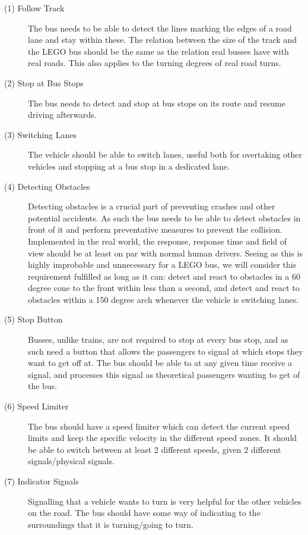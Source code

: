 
\begin{description}
    \item [(1) Follow Track]
    The bus needs to be able to detect the lines marking the edges of a road lane and stay within these. The relation between the size of the track and the LEGO bus should be the same as the relation real busses have with real roads. This also applies to the turning degrees of real road turns. 
    
    \item[(2) Stop at Bus Stops]
    The bus needs to detect and stop at bus stops on its route and resume driving afterwards. 

    \item[(3) Switching Lanes] 
    The vehicle should be able to switch lanes, useful both for overtaking other vehicles and stopping at a bus stop in a dedicated lane. 
    
    \item[(4) Detecting Obstacles]
    Detecting obstacles is a crucial part of preventing crashes and other potential accidents. As such the bus needs to be able to detect obstacles in front of it and perform preventative measures to prevent the collision. Implemented in the real world, the response, response time and field of view should be at least on par with normal human drivers. Seeing as this is highly improbable and unnecessary for a LEGO bus, we will consider this requirement fulfilled as long as it can: detect and react to obstacles in a 60 degree cone to the front within less than a second, and detect and react to obstacles within a 150 degree arch whenever the vehicle is switching lanes. 
    
    \item[(5) Stop Button]
    Busses, unlike trains, are not required to stop at every bus stop, and as such need a button that allows the passengers to signal at which stops they want to get off at. The bus should be able to at any given time receive a signal, and processes this signal as theoretical passengers wanting to get of the bus.
    
    \item[(6) Speed Limiter]
    The bus should have a speed limiter which can detect the current speed limits and keep the specific velocity in the different speed zones. It should be able to switch between at least 2 different speeds, given 2 different signals/physical signals.
    
    \item[(7) Indicator Signals]
    Signalling that a vehicle wants to turn is very helpful for the other vehicles on the road. The bus should have some way of indicating to the surroundings that it is turning/going to turn.
\end{description}


